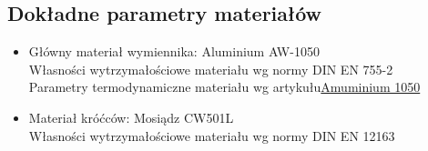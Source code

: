 \subsection{Dokładne parametry materiałów}
\begin{itemize}
    \item Główny materiał wymiennika: Aluminium AW-1050 \\
    Własności wytrzymałościowe materiału wg normy DIN EN 755-2\\
    Parametry termodynamiczne materiału wg artykułu\href{https://www.azom.com/article.aspx?ArticleID=2798}{Amuminium 1050}
    
    \item Materiał króćców: Mosiądz CW501L\\
    Własności wytrzymałościowe materiału wg normy DIN EN 12163
\end{itemize}    